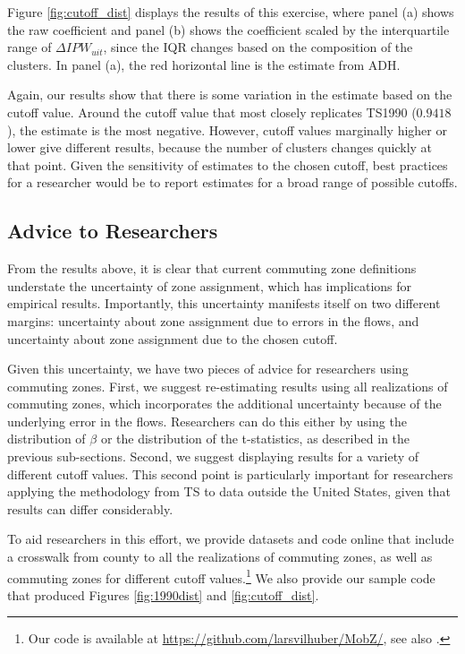 Figure \ref{fig:cutoff_dist} displays the results of this exercise, where panel (a) shows the raw coefficient and panel (b) shows the coefficient scaled by the interquartile range of $\Delta IPW_{uit}$, since the IQR changes based on the composition of the clusters. In panel (a),  the red horizontal line is the estimate from ADH.

Again, our results show that there is some variation in the estimate based on the cutoff value. Around the cutoff value that most closely replicates TS1990 ($0.9418$), the estimate is the most negative. However, cutoff values marginally higher or lower give different results, because the number of clusters changes quickly at that point. Given the sensitivity of estimates to the chosen cutoff, best practices for a researcher would be to report estimates for a broad range of possible cutoffs.	

\subsection{Advice to Researchers}

From the results above, it is clear that current commuting zone definitions understate the uncertainty of zone assignment, which has implications for empirical results. Importantly, this uncertainty manifests itself on two different margins: uncertainty about zone assignment due to errors in the flows, and uncertainty about zone assignment due to the chosen cutoff. 

Given this uncertainty, we have two pieces of advice for researchers using commuting zones. First, we suggest re-estimating results using all realizations of commuting zones, which incorporates the additional uncertainty because of the underlying error in the flows. Researchers can do this either by using the distribution of $\beta$ or the distribution of the t-statistics, as described in the previous sub-sections. Second, we suggest displaying results for a variety of different cutoff values. This second point is particularly important for researchers applying the  methodology from TS to data outside the United States, given that results can differ considerably. 

To aid researchers in this effort, we provide datasets and code online that include a crosswalk from county to all the realizations of commuting zones, as well as commuting zones for different cutoff values.\footnote{Our code is available at \url{https://github.com/larsvilhuber/MobZ/}, see also \citet{mobzrepl201704}.} We also provide our sample code that produced Figures \ref{fig:1990dist} and \ref{fig:cutoff_dist}.



